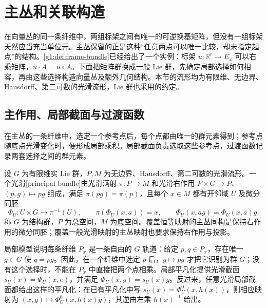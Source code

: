 
% 
% 

\section{主丛和关联构造}
\label{g1:sec:1801}

在向量丛的同一条纤维中，两组标架之间有唯一的可逆换基矩阵，但没有一组标架天然应当充当单位元。主丛保留的正是这种“任意两点可以唯一比较，却未指定起点”的结构。\cref{g1:def:frame-bundle}已经给出了一个实例：标架 \(u:\mathbb R^r\to E_x\) 可以右乘矩阵，\(u\cdot A=u\circ A\)。下面把矩阵群换成一般 Lie 群，先确定局部选择如何相容，再由这些选择构造向量丛及额外几何结构。本节的流形均为有限维、无边界、Hausdorff、第二可数的光滑流形，Lie 群也采用的约定。

\subsection{主作用、局部截面与过渡函数}
\label{g1:subsec:1801:01}

在主丛的一条纤维中，选定一个参考点后，每个点都由唯一的群元素得到；参考点随底点光滑变化时，便形成局部乘积。局部截面负责选取这些参考点，过渡函数记录两套选择之间的群元素。

\begin{definition}[主丛]\label{g1:def:principal-bundle}
	设 \(G\) 为有限维实 Lie 群，\(P,M\) 为无边界、Hausdorff、第二可数的光滑流形。一个光滑[principal bundle]由光滑满射 \(\pi:P\to M\) 和光滑右作用 \(P\times G\to P\)、\((p,g)\mapsto pg\) 组成，满足 \(\pi(pg)=\pi(p)\)，且每个 \(x\in M\) 都有开邻域 \(U\) 及微分同胚
	\[
		\Phi_U:U\times G\longrightarrow\pi^{-1}(U),
		\qquad \pi(\Phi_U(x,a))=x,\qquad
		\Phi_U(x,ag)=\Phi_U(x,a)g.
	\]
	称 \(G\) 为结构群，\(P\) 为总空间，\(M\) 为底空间。覆盖恒等映射的主丛同构是保持右作用的微分同胚；覆盖一般光滑映射的主丛映射也要求保持右作用与投影。
\end{definition}

局部模型说明每条纤维 \(P_x\) 是一条自由的 \(G\) 轨道：给定 \(p,q\in P_x\)，存在唯一 \(g\in G\) 使 \(q=pg\)。因此，在一个纤维中选定 \(p\) 后，\(g\mapsto pg\) 才把它识别为群 \(G\)；没有这个选择时，不能在 \(P_x\) 中直接把两个点相乘。局部平凡化提供光滑截面 \(s_U(x)=\Phi_U(x,e)\)，并满足 \(\Phi_U(x,g)=s_U(x)g\)。反过来，任意光滑局部截面都给出这样的平凡化：在已有平凡化中写 \(s_U(x)=\Phi_U^0(x,h(x))\)，则相应映射为 \((x,g)\mapsto\Phi_U^0(x,h(x)g)\)，其逆由左乘 \(h(x)^{-1}\) 给出。

